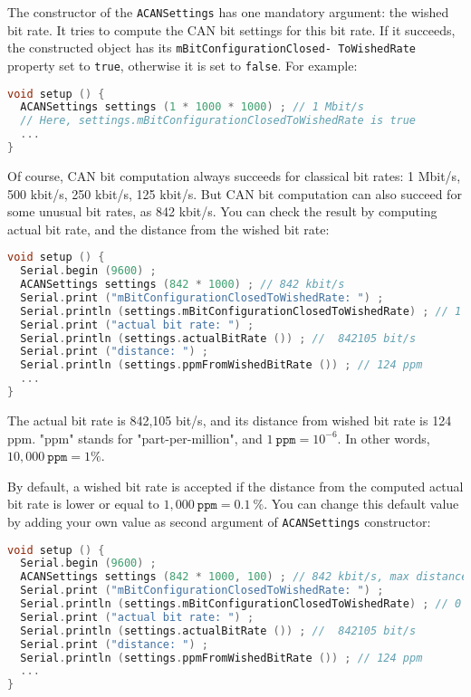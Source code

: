 \documentclass[10pt, a4paper, obeyspaces, openany]{extarticle}
\begin{document}
The constructor of the \texttt{ACANSettings} has one mandatory argument: the wished bit rate. It tries to compute the CAN bit settings for this bit rate. If it succeeds, the constructed object has its \texttt{mBitConfigurationClosed- ToWishedRate} property set to \texttt{true}, otherwise it is set to \texttt{false}. For example:
{ \small\begin{lstlisting}[language=c++]
void setup () {
  ACANSettings settings (1 * 1000 * 1000) ; // 1 Mbit/s
  // Here, settings.mBitConfigurationClosedToWishedRate is true
  ...
}
\end{lstlisting}}

Of course, CAN bit computation always succeeds for classical bit rates: 1 Mbit/s, 500 kbit/s, 250 kbit/s, 125 kbit/s. But CAN bit computation can also succeed for some unusual bit rates, as 842 kbit/s. You can check the result by computing actual bit rate, and the distance from the wished bit rate:
{ \small\begin{lstlisting}[language=c++]
void setup () {
  Serial.begin (9600) ;
  ACANSettings settings (842 * 1000) ; // 842 kbit/s
  Serial.print ("mBitConfigurationClosedToWishedRate: ") ;
  Serial.println (settings.mBitConfigurationClosedToWishedRate) ; // 1 (--> is true)
  Serial.print ("actual bit rate: ") ;
  Serial.println (settings.actualBitRate ()) ; //  842105 bit/s
  Serial.print ("distance: ") ;
  Serial.println (settings.ppmFromWishedBitRate ()) ; // 124 ppm
  ...
}
\end{lstlisting}}

The actual bit rate is 842,105 bit/s, and its distance from wished bit rate is 124 ppm. "ppm" stands for "part-per-million", and $1~\texttt{ppm} = 10^{-6}$. In other words, $10,000~\texttt{ppm}=1\%$.


By default, a wished bit rate is accepted if the distance from the computed actual bit rate is lower or equal to $1,000~\texttt{ppm} = 0.1~\%$. You can change this default value by adding your own value as second argument of \texttt{ACANSettings} constructor:
{ \small\begin{lstlisting}[language=c++]
void setup () {
  Serial.begin (9600) ;
  ACANSettings settings (842 * 1000, 100) ; // 842 kbit/s, max distance is 100 ppm
  Serial.print ("mBitConfigurationClosedToWishedRate: ") ;
  Serial.println (settings.mBitConfigurationClosedToWishedRate) ; // 0 (--> is false)
  Serial.print ("actual bit rate: ") ;
  Serial.println (settings.actualBitRate ()) ; //  842105 bit/s
  Serial.print ("distance: ") ;
  Serial.println (settings.ppmFromWishedBitRate ()) ; // 124 ppm
  ...
}
\end{lstlisting}}
\end{document}
